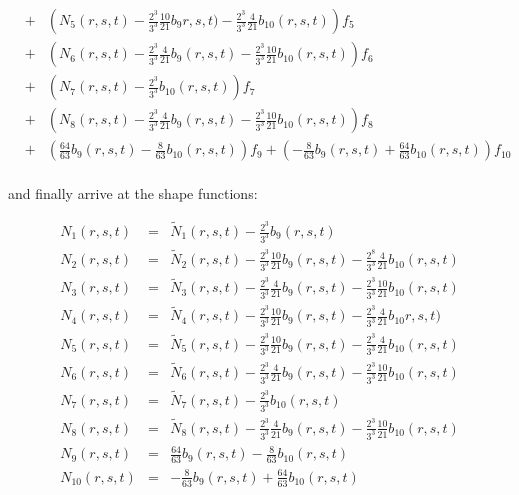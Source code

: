 \begin{eqnarray}
&+&\left( N_5(r,s,t)- \frac{2^3}{3^3}\frac{10}{21} b_{9}r,s,t) -\frac{2^3}{3^3}\frac{4}{21} b_{10}(r,s,t) \right) f_5 \nonumber\\
&+&\left( N_6(r,s,t) -\frac{2^3}{3^3}\frac{4}{21} b_9(r,s,t) -\frac{2^3}{3^3}\frac{10}{21} b_{10}(r,s,t) \right) f_6 \nonumber\\
&+&\left( N_7(r,s,t) - \frac{2^3}{3^3}b_{10}(r,s,t) \right) f_7 \nonumber\\
&+&\left(N_8(r,s,t) -\frac{2^3}{3^3}\frac{4}{21} b_9(r,s,t) -\frac{2^3}{3^3}\frac{10}{21} b_{10}(r,s,t) \right) f_8 \nonumber\\
&+& \left(  \frac{64}{63}b_9(r,s,t) -\frac{8}{63} b_{10}(r,s,t) \right) f_9 
+ \left( -\frac{8}{63} b_{9}(r,s,t)  + \frac{64}{63}b_{10}(r,s,t) \right) f_{10} \nonumber\\
\end{eqnarray}

and finally arrive at the shape functions:
\begin{mdframed}[backgroundcolor=blue!5]
\begin{eqnarray}
N_1(r,s,t)    &=&  \tilde{N}_1(r,s,t) - \frac{2^3}{3^3}b_9(r,s,t)      \nonumber\\
N_2(r,s,t)    &=&  \tilde{N}_2(r,s,t) - \frac{2^3}{3^3}\frac{10}{21} b_9(r,s,t) - \frac{2^8}{3^3}\frac{4}{21} b_{10}(r,s,t)      \nonumber\\
N_3(r,s,t)    &=&  \tilde{N}_3(r,s,t)  -\frac{2^3}{3^3}\frac{4}{21} b_9(r,s,t) -\frac{2^3}{3^3}\frac{10}{21} b_{10}(r,s,t)      \nonumber\\
N_4(r,s,t)    &=&  \tilde{N}_4(r,s,t) -\frac{2^3}{3^3}\frac{10}{21} b_{9}(r,s,t) -\frac{2^3}{3^3}\frac{4}{21} b_{10}r,s,t)      \nonumber\\
N_5(r,s,t)    &=&  \tilde{N}_5(r,s,t)- \frac{2^3}{3^3}\frac{10}{21} b_{9}(r,s,t) -\frac{2^3}{3^3}\frac{4}{21} b_{10}(r,s,t)      \nonumber\\
N_6(r,s,t)    &=&  \tilde{N}_6(r,s,t) -\frac{2^3}{3^3}\frac{4}{21} b_9(r,s,t) -\frac{2^3}{3^3}\frac{10}{21} b_{10}(r,s,t)      \nonumber\\
N_7(r,s,t)    &=&  \tilde{N}_7(r,s,t) - \frac{2^3}{3^3}b_{10}(r,s,t)      \nonumber\\
N_8(r,s,t)    &=&  \tilde{N}_8(r,s,t) -\frac{2^3}{3^3}\frac{4}{21} b_9(r,s,t) -\frac{2^3}{3^3}\frac{10}{21} b_{10}(r,s,t)      \nonumber\\
N_9(r,s,t)    &=&  \frac{64}{63}b_9(r,s,t) -\frac{8}{63} b_{10}(r,s,t)      \nonumber\\
N_{10}(r,s,t) &=&  -\frac{8}{63} b_{9}(r,s,t)  + \frac{64}{63}b_{10}(r,s,t)       \nonumber
\end{eqnarray}
\end{mdframed}


